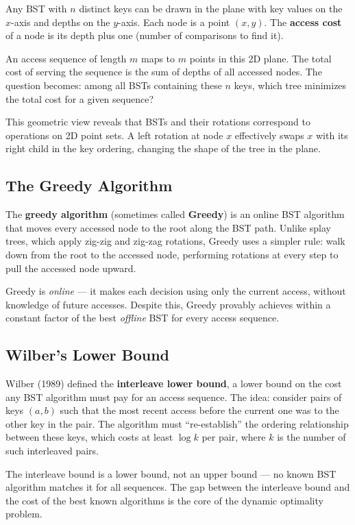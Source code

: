 Any BST with $n$ distinct keys can be drawn in the plane with key values on the $x$-axis and depths on the $y$-axis. Each node is a point $(x, y)$. The \textbf{access cost} of a node is its depth plus one (number of comparisons to find it).

An access sequence of length $m$ maps to $m$ points in this 2D plane. The total cost of serving the sequence is the sum of depths of all accessed nodes. The question becomes: among all BSTs containing these $n$ keys, which tree minimizes the total cost for a given sequence?

This geometric view reveals that BSTs and their rotations correspond to operations on 2D point sets. A left rotation at node $x$ effectively swaps $x$ with its right child in the key ordering, changing the shape of the tree in the plane.

\subsection{The Greedy Algorithm}

The \textbf{greedy algorithm} (sometimes called \textbf{Greedy}) is an online BST algorithm that moves every accessed node to the root along the BST path. Unlike splay trees, which apply zig-zig and zig-zag rotations, Greedy uses a simpler rule: walk down from the root to the accessed node, performing rotations at every step to pull the accessed node upward.

Greedy is \textit{online} --- it makes each decision using only the current access, without knowledge of future accesses. Despite this, Greedy provably achieves within a constant factor of the best \textit{offline} BST for every access sequence.

\subsection{Wilber's Lower Bound}

Wilber (1989) defined the \textbf{interleave lower bound}, a lower bound on the cost any BST algorithm must pay for an access sequence. The idea: consider pairs of keys $(a, b)$ such that the most recent access before the current one was to the other key in the pair. The algorithm must ``re-establish'' the ordering relationship between these keys, which costs at least $\log k$ per pair, where $k$ is the number of such interleaved pairs.

The interleave bound is a lower bound, not an upper bound --- no known BST algorithm matches it for all sequences. The gap between the interleave bound and the cost of the best known algorithms is the core of the dynamic optimality problem.

